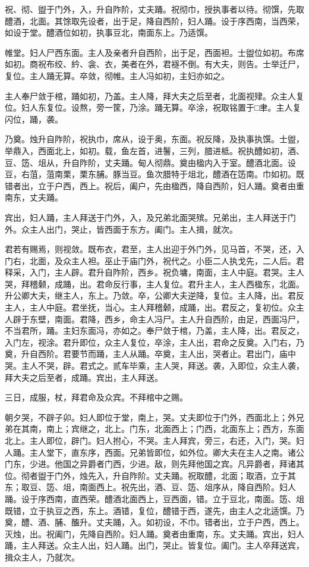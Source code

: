 \documentclass[]{article}
\begin{document}
祝、彻、盥于门外，入，升自阼阶，丈夫踊。祝彻巾，授执事者以待。彻馔，先取醴酒，北面。其馀取先设者，出于足，降自西阶，妇人踊。设于序西南，当西荣，如设于堂。醴酒位如初，执事豆北，南面东上。乃适馔。

帷堂。妇人尸西东面。主人及亲者升自西阶，出于足，西面袒。士盥位如初。布席如初。商祝布绞、紟、衾、衣，美者在外，君襚不倒。有大夫，则告。士举迁尸，复位。主人踊无算。卒敛，彻帷。主人冯如初，主妇亦如之。

主人奉尸敛于棺，踊如初，乃盖。主人降，拜大夫之后至者，北面视肂。众主人复位。妇人东复位。设熬，旁一筐，乃涂。踊无算。卒涂，祝取铭置于□聿。主人复闪位，踊，袭。

乃奠。烛升自阼阶，祝执巾，席从，设于奥，东面。祝反降，及执事执馔。士盥，举鼎入，西面北上，如初。载，鱼左首，进鬐，三列，腊进柢。祝执醴如初，酒、豆、笾、俎从，升自阼阶，丈夫踊。甸人彻鼎。奠由楹内入于室。醴酒北面。设豆，右菹，菹南栗，栗东脯。豚当豆。鱼次腊特于俎北，醴酒在笾南。巾如初。既错者出，立于户西，西上。祝后，阖户，先由楹西，降自西阶，妇人踊。奠者由重南东，丈夫踊。

宾出，妇人踊，主人拜送于门外，入，及兄弟北面哭殡。兄弟出，主人拜送于门外。众主人出门，哭止，皆西面于东方。阖门。主人揖，就次。

君若有赐焉，则视敛。既布衣，君至，主人出迎于外门外，见马首，不哭，还，入门右，北面，及众主人袒。巫止于庙门外，祝代之。小臣二人执戈先，二人后。君释采，入门，主人辟。君升自阼阶，西乡。祝负墉，南面，主人中庭。君哭。主人哭，拜稽颡，成踊，出。君命反行事，主人复位。君升主人，主人西楹东，北面。升公卿大夫，继主人，东上。乃敛。卒，公卿大夫逆降，复位。主人降，出。君反主人，主人中庭。君坐抚，当心。主人拜稽颡，成踊，出。君反之，复初位。众主人辟于东壁，南面。君降，西乡，命主人冯尸。主人升自西阶，由足，西面冯尸，不当君所，踊。主妇东面冯，亦如之。奉尸敛于棺，乃盖，主人降，出。君反之，入门左，视涂。君升即位，众主人复位，卒涂，主人出，君命之反奠。入门右，乃奠，升自西阶。君要节而踊，主人从踊。卒奠，主人出，哭者止。君出门，庙中哭。主人不哭，辟。君式之。贰车毕乘，主人哭，拜送。袭，入即位，众主人袭，拜大夫之后至者，成踊。宾出，主人拜送。

三日，成服，杖，拜君命及众宾。不拜棺中之赐。

朝夕哭，不辟子卯。妇人即位于堂，南上，哭。丈夫即位于门外，西面北上；外兄弟在其南，南上；宾继之，北上。门东，北面西上；门西，北面东上；西方，东面北上。主人即位，辟门。妇人拊心，不哭。主人拜宾，旁三，右还，入门，哭。妇人踊。主人堂下，直东序，西面。兄弟皆即位，如外位。卿大夫在主人之南。诸公门东，少进。他国之异爵者门西，少进。敌，则先拜他国之宾。凡异爵者，拜诸其位。彻者盥于门外，烛先入，升自阼阶。丈夫踊。祝取醴，北面；取酒，立于其东；取豆、笾、俎，南面西上。祝先出，酒、豆、笾、俎序从，降自西阶。妇人踊。设于序西南，直西荣。醴酒北面西上，豆西面，错。立于豆北，南面。笾、俎既错，立于执豆之西，东上。酒错，复位，醴错于西，遂先，由主人之北适馔。乃奠，醴、酒、脯、醢升。丈夫踊，入。如初设，不巾。错者出，立于户西，西上。灭烛，出。祝阖门，先降自西阶。妇人踊。奠者由重南，东。丈夫踊。宾出，妇人踊，主人拜送。众主人出，妇人踊。出门，哭止。皆复位。阖门。主人卒拜送宾，揖众主人，乃就次。
\end{document}
